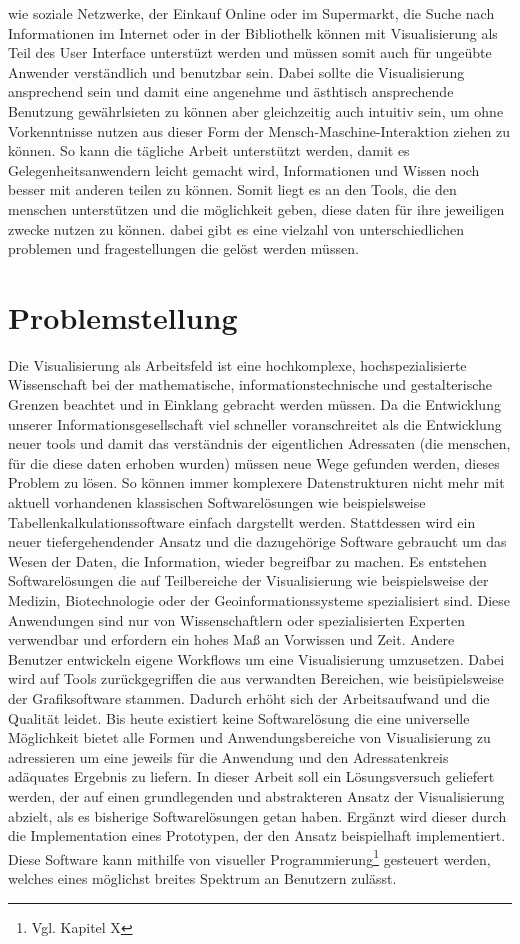 \documentclass[a4paper, 12pt, DIVcalc, onepage, pdftex, headsepline, footsepline]{scrreprt}
\begin{document}
wie soziale Netzwerke, der Einkauf Online oder im Supermarkt, die Suche nach Informationen im
Internet oder in der Bibliothelk können mit Visualisierung als Teil des User Interface unterstüzt
werden und müssen somit auch für ungeübte Anwender verständlich und benutzbar sein. Dabei sollte
die Visualisierung ansprechend sein und damit eine angenehme und ästhtisch ansprechende Benutzung
gewährlsieten zu können aber gleichzeitig auch intuitiv sein, um ohne Vorkenntnisse nutzen aus
dieser Form der Mensch-Maschine-Interaktion ziehen zu können. So kann die tägliche Arbeit
unterstützt werden, damit es Gelegenheitsanwendern leicht gemacht wird, Informationen und
Wissen noch besser mit anderen teilen zu können. Somit liegt es an den Tools, die den menschen
unterstützen und die möglichkeit geben, diese daten für ihre jeweiligen zwecke nutzen zu können.
dabei gibt es eine vielzahl von unterschiedlichen problemen und fragestellungen die gelöst werden
müssen.

\section{Problemstellung}
Die Visualisierung als Arbeitsfeld ist eine hochkomplexe, hochspezialisierte Wissenschaft bei der
mathematische, informationstechnische und gestalterische Grenzen beachtet und in Einklang gebracht
werden müssen. Da die Entwicklung unserer Informationsgesellschaft viel schneller voranschreitet als
die Entwicklung neuer tools und damit das verständnis der eigentlichen Adressaten (die menschen, für
die diese daten erhoben wurden) müssen neue Wege gefunden werden, dieses Problem zu lösen. So können
immer komplexere Datenstrukturen nicht mehr mit aktuell vorhandenen klassischen Softwarelösungen wie 
beispielsweise Tabellenkalkulationssoftware
einfach dargstellt werden. Stattdessen wird ein neuer tiefergehendender Ansatz und die dazugehörige
Software gebraucht um das Wesen der Daten, die Information, wieder begreifbar zu machen.
Es entstehen Softwarelösungen die auf Teilbereiche der Visualisierung wie beispielsweise der Medizin,
Biotechnologie oder der Geoinformationssysteme spezialisiert sind. Diese Anwendungen sind nur von
Wissenschaftlern oder spezialisierten Experten verwendbar und erfordern ein hohes Maß an Vorwissen
und Zeit.
Andere Benutzer entwickeln eigene Workflows um eine Visualisierung umzusetzen.
Dabei wird auf Tools zurückgegriffen die aus verwandten Bereichen, wie beisüpielsweise der Grafiksoftware stammen.
Dadurch erhöht sich der Arbeitsaufwand und die Qualität leidet. Bis heute existiert keine
Softwarelösung die eine universelle Möglichkeit bietet alle Formen und Anwendungsbereiche von
Visualisierung zu adressieren um eine jeweils für die Anwendung und den Adressatenkreis adäquates
Ergebnis zu liefern.
In dieser Arbeit soll ein Lösungsversuch geliefert werden, der auf einen grundlegenden und
abstrakteren Ansatz der Visualisierung abzielt, als es bisherige Softwarelösungen getan haben.
Ergänzt wird dieser durch die Implementation eines Prototypen, der den Ansatz beispielhaft
implementiert.
Diese Software kann mithilfe von visueller Programmierung\footnote{Vgl. Kapitel X} gesteuert werden,
welches eines möglichst breites Spektrum an Benutzern zulässt. 
\end{document}
